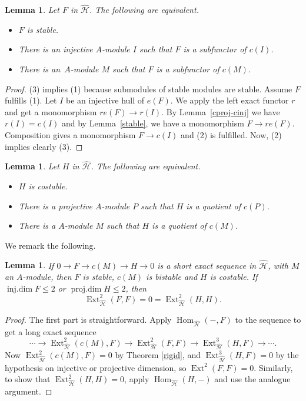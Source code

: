 \documentclass[11pt,a4paper]{amsart}
\theoremstyle{plain}
\newtheorem{lem}[thm]{Lemma}
\theoremstyle{definition}
\begin{document}
\begin{lem} 
\label{l:Fstable}
Let $F$ in ${\widehat{\mathcal{H}}  }$. The following are equivalent. 
\begin{itemize}
\item[(1)] $F$ is stable.
\item[(2)] There is an injective $A$-module $I$ such that $F$ is a subfunctor of ${c} (I)$.
\item[(3)]  There is an\ $A$-module $M$ such that $F$ is a subfunctor of ${c} (M)$.
\end{itemize}
\end{lem}

\begin{proof} 
(3) implies (1) because submodules of stable modules are stable. 
Assume $F$ fulfills (1). Let $I$ be an injective hull of ${e} (F)$. We apply the left exact functor ${r}$ and get a monomorphism ${r} {e} (F) \to {r} (I)$. By Lemma~\ref{cproj-cinj} we have ${r} (I) ={c} (I)$ and by Lemma~\ref{stable}, we have a monomorphism $F\to {r} {e} (F)$. Composition gives a monomorphism $F\to {c} (I)$ and (2) is fulfilled.
Now, (2) implies clearly (3). 
\end{proof}

\begin{lem}
\label{l:Hcostable}
Let $H$ in ${\widehat{\mathcal{H}}  }$. The following are equivalent. 
\begin{itemize}
\item[(1)] $H$ is costable.
 \item[(2)] There is a projective $A$-module $P$ such that $H$ is a quotient of ${c} (P)$.
 \item[(3)]  There is a $A$-module $M$ such that $H$ is a quotient of ${c} (M)$.
\end{itemize}
 \end{lem}

We remark the following. 
\begin{lem}\label{Ext2} 
If
$
0\to F\to {c} (M) \to H \to 0
$
is a short exact sequence in ${\widehat{\mathcal{H}}  }$, with $M$ an $A$-module,
then $F$ is stable, ${c} (M)$ is bistable and $H$ is costable. 
If $\operatorname{inj.dim} F\leq 2$ or $\operatorname{proj.dim} H \leq 2$, then  
\[ 
\operatorname{Ext}^2_{\widehat{\mathcal{H}}  }(F,F)=0=\operatorname{Ext}^2_{\widehat{\mathcal{H}}  }(H,H). 
\]
\end{lem}

\begin{proof}
The first part is straightforward.
Apply $\operatorname{Hom}_{\widehat{\mathcal{H}}  }(-, F)$ to the sequence to get a long exact sequence
\[
\cdots \to \operatorname{Ext}^2_{\widehat{\mathcal{H}}  }({c} (M), F) \to \operatorname{Ext}^2_{\widehat{\mathcal{H}}  }(F,F)\to \operatorname{Ext}^3_{\widehat{\mathcal{H}}  }(H,F)\to \cdots. \]
Now $\operatorname{Ext}^2_{\widehat{\mathcal{H}}  }({c}(M), F)=0$ by Theorem \ref{rigid}, and
$\operatorname{Ext}^3_{\widehat{\mathcal{H}}  }(H,F) = 0$ by the hypothesis on injective or projective dimension,
so $\operatorname{Ext}^2(F,F)=0$. 
Similarly, to show that
$\operatorname{Ext}^2_{\widehat{\mathcal{H}}  }(H,H)=0$, apply $\operatorname{Hom}_{\widehat{\mathcal{H}}  }(H,-)$ and use the analogue argument.
\end{proof}
\end{document}

